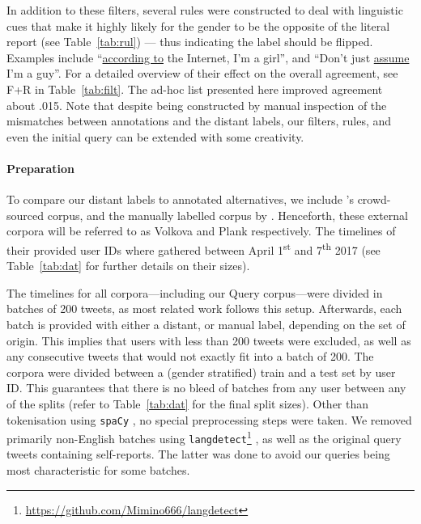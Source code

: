 \documentclass[11pt,letterpaper]{article}
\begin{document}
In addition to these filters, several rules were constructed to deal with
linguistic cues that make it highly likely for the gender to be the opposite of
the literal report (see Table~\ref{tab:rul}) --- thus indicating the label
should be flipped. Examples include ``\ul{according to} the
Internet, I'm a girl'', and ``Don't just \ul{assume} I'm a guy''. For
a detailed overview of their effect
on the overall agreement, see F+R in Table~\ref{tab:filt}. The ad-hoc list presented
here improved agreement about .015. Note that despite being
constructed by manual inspection of the mismatches between annotations and
the distant labels, our filters, rules, and even the initial query can be
extended with some creativity.

\paragraph{Preparation}

To compare our distant labels to annotated alternatives, we include
's crowd-sourced corpus, and the manually labelled
corpus by . Henceforth, these
external corpora will be referred to as Volkova and Plank respectively.
The timelines of their provided user IDs where gathered between April
1\textsuperscript{st} and 7\textsuperscript{th} 2017
(see Table~\ref{tab:dat} for further details on their sizes).

The timelines for all corpora---including our Query corpus---were divided in
batches of 200 tweets, as most related work follows this setup. Afterwards,
each batch is provided with either a distant, or manual label, depending on the set of
origin. This implies that users with less than 200 tweets were excluded, as
well as any consecutive tweets that would not exactly fit into a batch of 200. The
corpora were divided between a (gender stratified) train and a test set by user ID. This
guarantees that there is no bleed of batches from any user between any of the
splits (refer to Table~\ref{tab:dat} for the final split sizes). Other than
tokenisation using {\tt spaCy} \cite{honnibal2015}, no special preprocessing
steps were taken. We removed primarily non-English batches using
\texttt{langdetect}\footnote{\url{https://github.com/Mimino666/langdetect}}
\cite{shuyo2010}, as well as the original query tweets containing self-reports.
The latter was done to avoid our queries being most characteristic for some batches.
\end{document}
